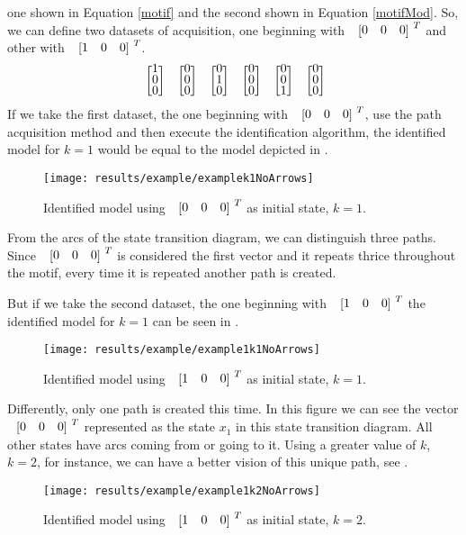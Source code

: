 one shown in Equation
\ref{motif} and the second shown in Equation \ref{motifMod}. So, we can define two datasets of acquisition,
one beginning with $\colvec{0&0&0}^T$ and other with $\colvec{1&0&0}^T$.
\begin{align}
  \label{motifMod}
\colvec{1\\0\\0}\colvec{0\\0\\0}\colvec{0\\1\\0}\colvec{0\\0\\0}\colvec{0\\0\\1}\colvec{0\\0\\0}
\end{align}
If we take the first dataset, the one beginning with $\colvec{0&0&0}^T$, use the
path acquisition method and then
execute the identification algorithm, the identified model for $k=1$ would be
equal to the model depicted in . 
\begin{figure}[H]
  \centering
 \texttt{[image: results/example/examplek1NoArrows]}
  \caption{Identified model using $\colvec{0&0&0}^T$ as initial state, $k=1$.}
    \label{fig:exampleCol000k1}
\end{figure}
From the arcs of the state transition diagram, we can distinguish three paths. Since
$\colvec{0&0&0}^T$ is considered the first vector and it repeats thrice
throughout the motif, every time it is repeated another path is created.

But if we take the second dataset, the one beginning with $\colvec{1&0&0}^T$ the identified model for $k=1$ can be
seen in . 
\begin{figure}[H]
  \centering
  \texttt{[image: results/example/example1k1NoArrows]}
  \caption{Identified model using $\colvec{1&0&0}^T$ as initial state, $k=1$.}
    \label{fig:exampleCol100k1}
\end{figure}
Differently, only one path is created this time. In this figure we can see the vector $\colvec{0&0&0}^T$ represented as the state
$x_1$ in this state transition diagram. All other states have arcs coming
from or going to it. Using a greater value of $k$, $k=2$, for instance, we can have a
better vision of this unique path, see .
\begin{figure}[H]
  \centering
  \texttt{[image: results/example/example1k2NoArrows]}
  \caption{Identified model using $\colvec{1&0&0}^T$ as initial state, $k=2$.}
    \label{fig:exampleCol100k2}
  \end{figure}


